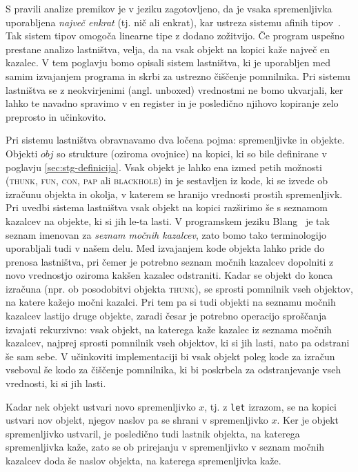S pravili analize premikov je v jeziku zagotovljeno, da je vsaka spremenljivka uporabljena \emph{največ enkrat} (tj. nič ali enkrat), kar ustreza sistemu afinih tipov~\cite{pierce2004advanced}. Tak sistem tipov omogoča linearne tipe z dodano zožitvijo. Če program uspešno prestane analizo lastništva, velja, da na vsak objekt na kopici kaže naj\-več en kazalec. V tem poglavju bomo opisali sistem lastništva, ki je uporabljen med samim izvajanjem programa in skrbi za ustrezno čiščenje pomnilnika. Pri sistemu lastništva se z neokvirjenimi (angl. unboxed) vrednostmi ne bomo ukvarjali, ker lahko te navadno spravimo v en register in je posledično njihovo kopiranje zelo preprosto in učinkovito.

Pri sistemu lastništva obravnavamo dva ločena pojma: spremenljivke in objekte. Objekti $obj$ so strukture (oziroma ovojnice) na kopici, ki so bile definirane v poglavju \ref{sec:stg-definicija}. Vsak objekt je lahko ena izmed petih možnosti (\textsc{thunk}, \textsc{fun}, \textsc{con}, \textsc{pap} ali \textsc{blackhole}) in je sestavljen iz kode, ki se izvede ob izračunu objekta in okolja, v katerem se hranijo vrednosti prostih spremenljivk. Pri uvedbi sistema lastništva vsak objekt na kopici razširimo še s seznamom kazalcev na objekte, ki si jih le-ta lasti. V programskem jeziku Blang~\cite{turk2022len} je tak  seznam imenovan za \textit{seznam močnih kazalcev}, zato bomo tako terminologijo uporabljali tudi v našem delu. Med izvajanjem kode objekta lahko pride do prenosa lastništva, pri čemer je potrebno seznam močnih kazalcev dopolniti z novo vrednostjo oziroma kakšen kazalec odstraniti. Kadar se objekt do konca izračuna (npr. ob posodobitvi objekta \textsc{thunk}), se sprosti pomnilnik vseh objektov, na katere kažejo močni kazalci. Pri tem pa si tudi objekti na seznamu močnih kazalcev lastijo druge objekte, zaradi česar je potrebno operacijo sproščanja izvajati rekurzivno: vsak objekt, na katerega kaže kazalec iz seznama močnih kazalcev, najprej sprosti pomnilnik vseh objektov, ki si jih lasti, nato pa odstrani še sam sebe. V učinkoviti implementaciji bi vsak objekt poleg kode za izračun vseboval še kodo za čiščenje pomnilnika, ki bi poskrbela za odstranjevanje vseh vrednosti, ki si jih lasti.

Kadar nek objekt ustvari novo spremenljivko $x$, tj. z \texttt{let} izrazom, se na kopici ustvari nov objekt, njegov naslov pa se shrani v spremenljivko $x$. Ker je objekt spremenljivko ustvaril, je posledično tudi lastnik objekta, na katerega spremenljivka kaže, zato se ob prirejanju v spremenljivko v seznam močnih kazalcev doda še naslov objekta, na katerega spremenljivka kaže.

